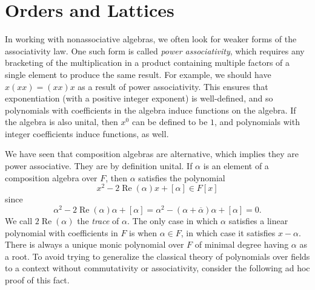 \documentclass[10pt]{amsart}
\newcommand{\Q}{\mathbb{Q}}
\renewcommand{\O}{\mathbb{O}}
\DeclareMathOperator*{\re}{Re}
\renewcommand{\bar}{\overline}
\newcommand{\norm}[1]{\left[#1\right]}
\begin{document}
\begin{comment}
We now have an embedding of $Q$, as a composition algebra, into $\O$ taking $\beta_k \mapsto \sqrt{\norm{\beta_k}}i_k$ for each $k \in S$.  The norm on $Q$ is rational-valued, so $\norm{\beta_k} \in \Q$ for each $k$.  If $n = 1$ or $2$, it is clear that $Q$ must be $\Q$ or $\Q(\sqrt{\norm{\beta_0}}i_0)$.  If $n = 4$, then $\sqrt{\norm{\beta_0}}i_0$ and $\sqrt{\norm{\beta_1}}i_1$, together with $\Q$, generate a 4-dimensional space, so $Q$ must be $\Q(\sqrt{\norm{\beta_0}}i_0, \sqrt{\norm{\beta_1}}i_1)$.  Similarly, if $n = 8$ then the first $3$ imaginary basis vectors generate an $8$-dimensional algebra over $\Q$, so $Q$ must be $\Q(\sqrt{\norm{\beta_0}}i_0, \sqrt{\norm{\beta_1}}i_1, \sqrt{\norm{\beta_2}}i_2)$.  Clearly, the numerator and denominator of $\sqrt{\norm{\beta_k}}i_k$ can be made squarefree by scaling by some rational number.
\end{proof}
\end{comment}

\section{Orders and Lattices}

In working with nonassociative algebras, we often look for weaker forms of the associativity law.  One such form is called \emph{power associativity}, which requires any bracketing of the multiplication in a product containing multiple factors of a single element to produce the same result.  For example, we should have $x(xx) = (xx)x$ as a result of power associativity.  This ensures that exponentiation (with a positive integer exponent) is well-defined, and so polynomials with coefficients in the algebra induce functions on the algebra.  If the algebra is also unital, then $x^0$ can be defined to be $1$, and polynomials with integer coefficients induce functions, as well.

We have seen that composition algebras are alternative, which implies they are power associative.  They are by definition unital.  If $\alpha$ is an element of a composition algebra over $F$, then $\alpha$ satisfies the polynomial
$$
x^2 - 2\re(\alpha)x + \norm{\alpha} \in F[x]
$$
since $$\alpha^2 - 2\re(\alpha)\alpha + [\alpha] = \alpha^2 - (\alpha + \bar{\alpha})\alpha + [\alpha] = 0.$$
We call $2\re(\alpha)$ the \emph{trace} of $\alpha$.  The only case in which $\alpha$ satisfies a linear polynomial with coefficients in $F$ is when $\alpha \in F$, in which case it satisfies $x - \alpha$.  There is always a unique monic polynomial over $F$ of minimal degree having $\alpha$ as a root.  To avoid trying to generalize the classical theory of polynomials over fields to a context without commutativity or associativity, consider the following ad hoc proof of this fact.
\end{document}
